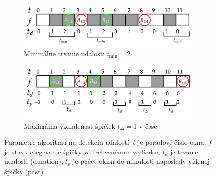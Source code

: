 \begin{figure}[h]
\centering
\begin{subfigure}[b]{0.8\textwidth}
    \centering
    \includegraphics[width=\textwidth]{figures/design/event-detection-min-duration.png}
    \caption{Minimálne trvanie udalosti $t_{\min} = 2$}
\end{subfigure}
\begin{subfigure}[b]{0.8\textwidth}
    \centering
    \includegraphics[width=\textwidth]{figures/design/event-detection-time-proximity.png}
    \caption{Maximálna vzdialenosť špičiek $t_{\Delta} = 1$ v čase}
\end{subfigure}
\caption{Parametre algoritmu na detekciu udalostí. $t$ je poradové číslo okna, $f$ je stav detegovanie špičky
vo frekvenčnom vedierku, $t_d$ je trvanie udalosti (duration), $t_p$ je počet okien do minulosti naposledy videnej špičky (past)}
\end{figure}

